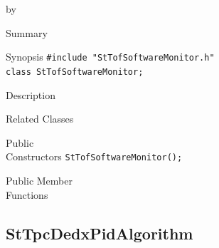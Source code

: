 \documentclass[twoside]{article}
\newcommand{\entrylabel}[1]{\mbox{\textbf{{#1}}}\hfil}%
\newenvironment{entry}
{\begin{list}{}%
    {\renewcommand{\makelabel}{\entrylabel}%
     \setlength{\labelwidth}{90pt}%
     \setlength{\leftmargin}{\labelwidth}
     \advance\leftmargin by \labelsep%
      }%
    }%
  {\end{list}}
\newcommand{\Entrylabel}[1]%
{\raisebox{0pt}[1ex][0pt]{\makebox[\labelwidth][l]%
    {\parbox[t]{\labelwidth}{\hspace{0pt}\textbf{{#1}}}}}}
\newenvironment{Entry}%
{\renewcommand{\entrylabel}{\Entrylabel}\begin{entry}}%
  {\end{entry}}
\begin{document}
\begin{Entry}
\item[Summary]
\item[Synopsis]
    \verb+#include "StTofSoftwareMonitor.h"+\\
    \verb+class StTofSoftwareMonitor;+\\
\item[Description]
\item[Related Classes]
\item[Public\\ Constructors]
    \verb+StTofSoftwareMonitor();+\\
\item[Public Member\\ Functions]
\end{Entry}
\clearpage

\subsection{StTpcDedxPidAlgorithm}
\label{sec:StTpcDedxPidAlgorithm}
\end{document}
